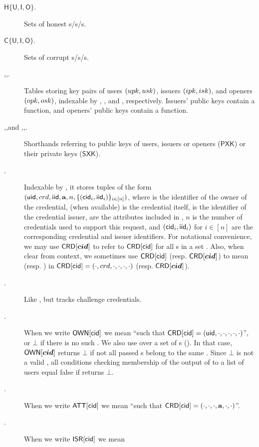 \begin{description}
\item[$\mathsf{H}\lbrace\mathsf{U},\mathsf{I},\mathsf{O} \rbrace$.] Sets of
  honest {\uid}s/{\iid}s/{\oid}s.
\item[$\mathsf{C}\lbrace\mathsf{U},\mathsf{I},\mathsf{O} \rbrace$.] Sets of
  corrupt {\uid}s/{\iid}s/{\oid}s.
\item[\UK,\IK,\OK.] Tables storing key pairs of users $(upk,usk)$, issuers
  $(ipk,isk)$, and openers $(opk,osk)$, indexable by \uid, \iid, and \oid,
  respectively. Issuers' public keys contain a \fissue function, and
  openers' public keys contain a \finsp function.
\item[\PUBUK,\PUBIK,\PUBOK and \PRVUK,\PRVIK,\PRVOK.] Shorthands referring to
  public keys of users, issuers or openers ($\mathsf{PXK}$) or their private
  keys ($\mathsf{SXK}$).
\item[\CRED.] Indexable by \cid, it stores
  tuples of the form $(\mathsf{uid},crd,\mathsf{iid},\mathbf{a},n,\lbrace (\mathsf{cid}_i,\mathsf{iid}_i)
  \rbrace_{i \in [n]})$, where \uid is the identifier of the owner of the
  credential, \cred (when available) is the credential itself, \iid is the
  identifier of the credential issuer, \attrs are the attributes included in
  \cred, $n$ is the number of credentials used to support this request, and
  $(\mathsf{cid}_i,\mathsf{iid}_i)$ for $i \in [n]$ are the corresponding credential and issuer
  identifiers. For notational convenience, we may use $\mathsf{CRD}[\boldsymbol{cid}]$
  to refer to $\mathsf{CRD}[\mathsf{cid}]$ for all {\cid}s in a set \scid. Also, when clear
  from context, we sometimes use $\mathsf{CRD}[\mathsf{cid}]$ (resp. $\mathsf{CRD}[\boldsymbol{cid}]$) to
  mean \cred (resp. \scred) in $\mathsf{CRD}[\mathsf{cid}] = (\cdot,crd,\cdot,\cdot,
  \cdot,\cdot)$ (resp. $\mathsf{CRD}[\boldsymbol{cid}]$).
\item[\CCRED.] Like \CRED, but tracks challenge credentials.
\item[\OWNR.] When we write $\mathsf{OWN}[\mathsf{cid}]$ we mean
  ``\uid such that $\mathsf{CRD}[\mathsf{cid}] = (\mathsf{uid},\cdot,\cdot,\cdot,\cdot,\cdot)$'', or
  $\bot$ if there is no such \uid. We also use \OWNR over a set of {\cid}s
  (\scid). In that case, $\mathsf{OWN}[\boldsymbol{cid}]$ returns $\bot$ if
  not all passed {\cid}s belong to the same \uid. Since $\bot$ is not a valid
  \uid, all conditions checking membership of the output of \OWNR to a list of
  users equal false if \OWNR returns $\bot$.
\item[\ATTR.] When we write $\mathsf{ATT}[\mathsf{cid}]$ we mean
  ``\attrs such that $\mathsf{CRD}[\mathsf{cid}] = (\cdot,\cdot,\cdot,\mathbf{a},\cdot,\cdot)$''.
\item[\ISR.] When we write $\mathsf{ISR}[\mathsf{cid}]$ we mean

\end{description}
